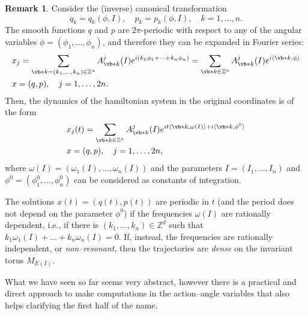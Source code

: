 \documentclass[english,fontsize=11pt,paper=b5]{scrbook}
\theoremstyle{definition}
\newtheorem{remark}{Remark}[chapter]
\begin{document}
      \begin{remark}\label{rmk:nonresonant}
        Consider the (inverse) canonical transformation
        \begin{equation}
          q_k = q_k(\phi, I), \quad p_k = p_k(\phi, I), \quad k=1,\ldots,n.
        \end{equation}
        The smooth functions $q$ and $p$ are $2\pi$-periodic with respect to any of the angular variables $\phi = (\phi_1, \ldots, \phi_n)$, and therefore they can be expanded in Fourier series:
        \begin{align}
     & x_j = \sum_{\vb* k = (k_1, \ldots, k_n)\in\mathbb{Z}^n} A^j_{\vb* k}(I) e^{i(k_1 \phi_1 + \cdots + k_n \phi_n)} = \sum_{\vb* k\in\mathbb{Z}^n} A^j_{\vb* k}(I) e^{i\langle\vb* k, \phi\rangle} \\
     & x = (q,p), \quad j=1,\ldots,2n.
        \end{align}
        Then, the dynamics of the hamiltonian system in the original coordinates is of the form
        \begin{align}
     & x_j(t) = \sum_{\vb* k\in\mathbb{Z}^n} A^j_{\vb* k}(I) e^{i t\langle\vb* k, \omega(I)\rangle + i\langle\vb* k,\phi^0\rangle} \\
     & x = (q,p), \quad j=1,\ldots,2n,
        \end{align}
        where $\omega(I) = (\omega_1(I), \ldots, \omega_n(I))$ and the parameters $I = (I_1, \ldots, I_n)$ and $\phi^0 = (\phi_1^0, \ldots, \phi_n^0)$ can be considered as constants of integration.

        The solutions $x(t) = (q(t), p(t))$ are periodic in $t$ (and the period does not depend on the parameter $\phi^0$) if the frequencies $\omega(I)$ are rationally dependent, i.e., if there is $(k_1, \ldots, k_n)\in\mathbb{Z}^d$ such that $k_1\omega_1(I) + \ldots + k_n \omega_n(I) = 0$.
        If, instead, the frequencies are rationally independent, or \emph{non--resonant}, then the trajectories are \emph{dense} on the invariant torus $M_{E(I)}$.
      \end{remark}

      What we have seen so far seems very abstract, however there is a practical and direct approach to make computations in the action--angle variables that also helps clarifying the first half of the name.
\end{document}
